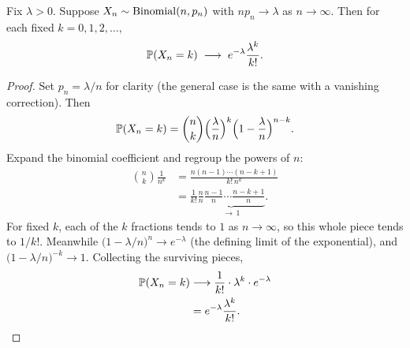 \begin{theorem}
\label{ch07:poisson-limit-thm}
Fix $\lambda > 0$. Suppose $X_n \sim \Bin(n, p_n)$ with $n p_n \to \lambda$ as
$n \to \infty$. Then for each fixed $k = 0,1,2,\dots$,
\[
  \P(X_n = k) \;\longrightarrow\; e^{-\lambda}\frac{\lambda^k}{k!}.
\]
\end{theorem}

\begin{proof}
Set $p_n = \lambda/n$ for clarity (the general case is the same with a vanishing
correction). Then
\[
  \P(X_n = k) = \binom{n}{k}\Bigl(\frac{\lambda}{n}\Bigr)^{k}
  \Bigl(1-\frac{\lambda}{n}\Bigr)^{n-k}.
\]
Expand the binomial coefficient and regroup the powers of $n$:
\begin{align*}
  \binom{n}{k}\frac{1}{n^k}
  &= \frac{n(n-1)\cdots(n-k+1)}{k!\,n^k} \\
  &= \frac{1}{k!}\underbrace{\frac{n}{n}\frac{n-1}{n}\cdots\frac{n-k+1}{n}}_{\to\,1}.
\end{align*}
For fixed $k$, each of the $k$ fractions tends to $1$ as $n\to\infty$, so this
whole piece tends to $1/k!$. Meanwhile
$\bigl(1-\lambda/n\bigr)^{n} \to e^{-\lambda}$ (the defining limit of the
exponential), and $\bigl(1-\lambda/n\bigr)^{-k} \to 1$. Collecting the surviving
pieces,
\begin{align*}
  \P(X_n = k) &\longrightarrow \frac{1}{k!}\cdot \lambda^k \cdot e^{-\lambda} \\
  &= e^{-\lambda}\frac{\lambda^k}{k!}. \qedhere
\end{align*}
\end{proof}

